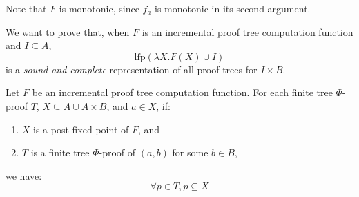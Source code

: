 \documentclass[12pt]{article}
\begin{document}
Note that $F$ is monotonic, since $f_a$ is monotonic in its second argument.

We want to prove that, when $F$ is an incremental proof tree computation function and $I\subseteq A$,
\[\text{lfp}(\lambda X.F(X)\cup I)\]
is a \emph{sound and complete} representation of all proof trees for $I\times B$.

\begin{theorem}[Soundness]
	Let $F$ be an incremental proof tree computation function.
	For each finite tree $\Phi$-proof $T$, $X\subseteq A\cup A\times B$, and $a\in X$, if:
	\begin{enumerate}
		\item $X$ is a post-fixed point of $F$, and
		\item $T$ is a finite tree $\Phi$-proof of $(a,b)$ for some $b\in B$,
	\end{enumerate}
	we have:
	\[\forall p\in T,p\subseteq X\]
\end{theorem}
\end{document}

